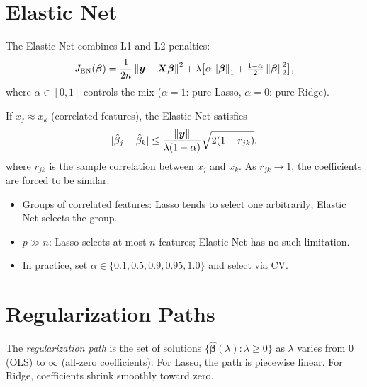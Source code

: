 \section{Elastic Net}

\begin{definition}
The Elastic Net combines L1 and L2 penalties:
\[
    J_{\text{EN}}(\bm{\beta})
    = \frac{1}{2n}\left\| \bm{y}-\bm{X}\bm{\beta} \right\|^2
    + \lambda\bigl[\alpha\left\| \bm{\beta} \right\|_1 + \tfrac{1-\alpha}{2}\left\| \bm{\beta} \right\|_2^2\bigr],
\]
where $\alpha \in [0,1]$ controls the mix ($\alpha=1$: pure Lasso, $\alpha=0$: pure Ridge).
\end{definition}

\begin{theorem}
If $x_j \approx x_k$ (correlated features), the Elastic Net satisfies
\[
    |\hat{\beta}_j - \hat{\beta}_k| \leq \frac{\left\| \bm{y} \right\|}{\lambda(1-\alpha)}\sqrt{2(1-r_{jk})},
\]
where $r_{jk}$ is the sample correlation between $x_j$ and $x_k$. As $r_{jk} \to 1$, the coefficients are forced to be similar.
\end{theorem}

\begin{bestpractice}[title=\textbf{When to Use Elastic Net}]
\begin{itemize}
    \item Groups of correlated features: Lasso tends to select one arbitrarily; Elastic Net selects the group.
    \item $p \gg n$: Lasso selects at most $n$ features; Elastic Net has no such limitation.
    \item In practice, set $\alpha \in \{0.1, 0.5, 0.9, 0.95, 1.0\}$ and select via CV.
\end{itemize}
\end{bestpractice}

\section{Regularization Paths}

\begin{definition}
The \emph{regularization path} is the set of solutions $\{\hat{\bm{\beta}}(\lambda) : \lambda \geq 0\}$ as $\lambda$ varies from $0$ (OLS) to $\infty$ (all-zero coefficients). For Lasso, the path is piecewise linear. For Ridge, coefficients shrink smoothly toward zero.
\end{definition}

